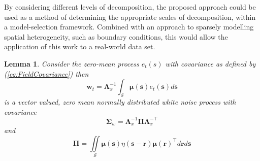 \documentclass[11pt,draftcls,onecolumn,peerreview]{IEEEtran}
\begin{document}
{{By considering different levels of decomposition, the proposed approach could be used as a method of determining the appropriate scales of decomposition, within a model-selection framework. Combined with an approach to sparsely modelling spatial heterogeneity, such as boundary conditions, this would allow the application of this work to a real-world data set.
\appendix  %
%
\newtheorem{lemma}{Lemma}
\begin{lemma}
Consider the zero-mean process $e_t\left(s\right)$ with covariance as defined by (\ref{eq:FieldCovariance}) then
\begin{equation}
 \mathbf{w}_t=\mathbf{\Lambda}_{x}^{-1}\int_{\mathcal{S}}\boldsymbol\mu \left(\mathbf{s}\right)e_t\left(\mathbf{s}\right)d\mathbf{s}
\label{eq:AppendixWt}
\end{equation}
is a vector valued, zero mean normally distributed white noise process with covariance
\begin{equation}
\boldsymbol\Sigma_w =\mathbf{\Lambda}_{x}^{-1}\boldsymbol\Pi\mathbf{\Lambda}_{x}^{- \top}
\end{equation}
and
\begin{equation}
 \boldsymbol\Pi=\iint\limits_{\mathcal{S}}\boldsymbol\mu\left(\mathbf s\right)\eta\left(\mathbf s-\mathbf r\right)\boldsymbol\mu\left(\mathbf r\right)^\top d\mathbf{r}d\mathbf{s}
\end{equation}

\end{lemma}}}
\end{document}
